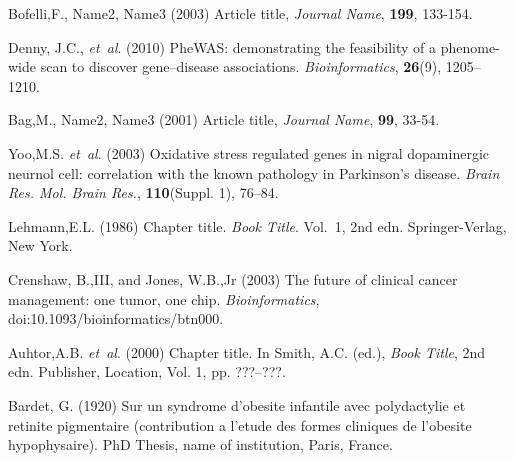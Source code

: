 \documentclass{bioinfo}
\begin{document}
\begin{thebibliography}{}

Bofelli,F., Name2, Name3 (2003) Article title, {\it Journal Name}, {\bf 199}, 133-154.

Denny, J.C., \textit{et~al}. (2010) PheWAS: demonstrating the feasibility of a phenome-wide scan to discover gene–disease associations. \textit{Bioinformatics}, \textbf{26}(9), 1205--1210.

Bag,M., Name2, Name3 (2001) Article title, {\it Journal Name}, {\bf 99}, 33-54.

Yoo,M.S. \textit{et~al}. (2003) Oxidative stress regulated genes
in nigral dopaminergic neurnol cell: correlation with the known
pathology in Parkinson's disease. \textit{Brain Res. Mol. Brain
Res.}, \textbf{110}(Suppl. 1), 76--84.

Lehmann,E.L. (1986) Chapter title. \textit{Book Title}. Vol.~1, 2nd edn. Springer-Verlag, New York.

Crenshaw, B.,III, and Jones, W.B.,Jr (2003) The future of clinical
cancer management: one tumor, one chip. \textit{Bioinformatics},
doi:10.1093/bioinformatics/btn000.

Auhtor,A.B. \textit{et~al}. (2000) Chapter title. In Smith, A.C.
(ed.), \textit{Book Title}, 2nd edn. Publisher, Location, Vol. 1, pp.
???--???.

Bardet, G. (1920) Sur un syndrome d'obesite infantile avec
polydactylie et retinite pigmentaire (contribution a l'etude des
formes cliniques de l'obesite hypophysaire). PhD Thesis, name of
institution, Paris, France.

\end{thebibliography}
\end{document}

